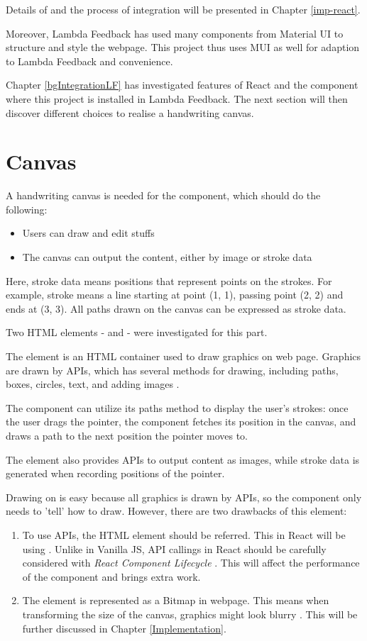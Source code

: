 \documentclass[12pt,twoside]{report}
\begin{document}
Details of  and the process of integration will be presented in Chapter \ref{imp-react}.

Moreover, Lambda Feedback has used many components from Material UI to structure and style the webpage. This project thus uses MUI as well for adaption to Lambda Feedback and convenience.

Chapter \ref{bgIntegrationLF} has investigated features of React and the
component where this project is installed in Lambda Feedback. The next section
will then discover different choices to realise a handwriting canvas.


\section{Canvas}
\label{bgCanvas}
A handwriting canvas is needed for the component, which should do the following:
\begin{itemize}
    \item Users can draw and edit stuffs
    \item The canvas can output the content, either by image or stroke data
\end{itemize}
Here, stroke data means positions that represent points on the strokes. For
example, stroke  means a line starting at point (1, 1), passing point (2, 2) and ends at (3, 3). All paths drawn on the canvas can be expressed as stroke data.

Two HTML elements -  and  - were investigated for this part.

The  element is an HTML container used
to draw graphics on web page. Graphics are drawn by APIs, which has several
methods for drawing, including paths, boxes, circles, text, and adding images
\cite{webcanvas}. 

The component can utilize its paths method to display the user's strokes: once the user drags the pointer, the component fetches its position in the canvas, and draws a path to the next position the pointer moves to. 

The  element also provides APIs to output content as images, while stroke data is generated when recording positions of the pointer.

Drawing on  is easy because all graphics is drawn by APIs, so the component only needs to 'tell'  how to draw. However, there are two drawbacks of this element: 
\begin{enumerate}
    \item To use  APIs, the HTML element should be referred. This in React will be using . Unlike in Vanilla JS, API callings in React should be carefully considered with \textit{React Component Lifecycle} \cite{webreactlife}. This will affect the performance of the component and brings extra work.
    \item The  element is represented as a Bitmap in webpage. This means when transforming the size of the canvas, graphics might look blurry \cite{webcanvasvssvg}. This will be further discussed in Chapter \ref{Implementation}.
\end{enumerate}
\end{document}
